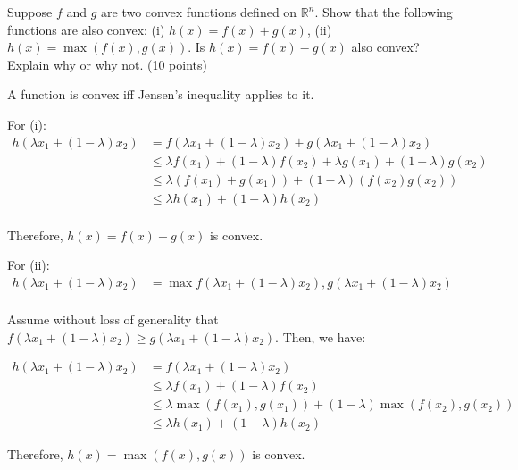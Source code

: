 \documentclass[fleqn]{homework}
\begin{document}
  \maketitle

  \begin{problem}{1}
    \begin{question}
      Suppose $f$ and $g$ are two convex functions defined on $\mathbb{R}^n$.
      Show that the following functions are also convex: (i)
      $h(x) = f(x) + g(x)$, (ii) $h(x) = \max{(f(x), g(x))}$.  Is
      $h(x) = f(x) - g(x)$ also convex?  Explain why or why not. (10 points)
    \end{question}

    A function is convex iff Jensen's inequality applies to it.

    For (i):
    \begin{align*}
      h(\lambda x_1 + (1 - \lambda) x_2) &= f(\lambda x_1 + (1 - \lambda) x_2) + g(\lambda x_1 + (1 - \lambda) x_2)\\
                                         &\leq \lambda f(x_1) + (1-\lambda)f(x_2) + \lambda g(x_1) + (1-\lambda)g(x_2)\\
                                         &\leq \lambda (f(x_1)+g(x_1)) + (1-\lambda)(f(x_2)g(x_2))\\
                                         &\leq \lambda h(x_1) + (1 - \lambda)h(x_2)\\
    \end{align*}

    Therefore, $h(x) = f(x) + g(x)$ is convex.

    For (ii):
    \begin{align*}
      h(\lambda x_1 + (1 - \lambda) x_2)
      &= \max{f(\lambda x_1 + (1 - \lambda) x_2), g(\lambda x_1 + (1 - \lambda) x_2)}\\
    \end{align*}

    Assume without loss of generality that
    $f(\lambda x_1 + (1 - \lambda) x_2) \geq g(\lambda x_1 + (1 - \lambda)
    x_2)$.  Then, we have:

    \begin{align*}
      h(\lambda x_1 + (1 - \lambda)x_2)
      &= f(\lambda x_1 + (1 - \lambda) x_2) \\
      &\leq \lambda f(x_1) + (1-\lambda) f(x_2) \\
      &\leq \lambda \max{(f(x_1),g(x_1))} + (1-\lambda)\max{(f(x_2), g(x_2))} \\
      &\leq \lambda h(x_1) + (1-\lambda)h(x_2)
    \end{align*}

    Therefore, $h(x) = \max{(f(x), g(x))}$ is convex.
  \end{problem}
\end{document}
